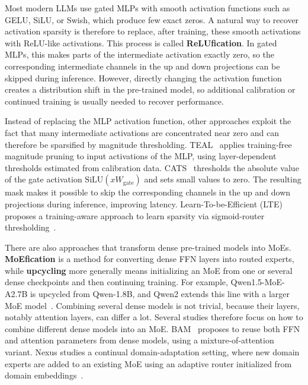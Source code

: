 Most modern LLMs use gated MLPs with smooth activation functions such as GELU,
SiLU, or Swish, which produce few exact zeros. A natural way to recover
activation sparsity is therefore to replace, after training, these smooth activations with
ReLU-like activations. This process is called \textbf{ReLUfication}\citep{mirzadeh2023relustrikesbackexploiting}. In gated
MLPs, this makes parts of the intermediate activation exactly zero, so the
corresponding intermediate channels in the up and down projections can be skipped
during inference. However, directly changing the activation function creates a
distribution shift in the pre-trained model, so additional calibration or
continued training is usually needed to recover performance.

Instead of replacing the MLP activation function, other approaches exploit
the fact that many intermediate activations are concentrated near zero and can
therefore be sparsified by magnitude thresholding. TEAL~\citep{TEAL} applies training-free
magnitude pruning to input activations of the MLP, using layer-dependent
thresholds estimated from calibration data. 
CATS~\citep{lee2024cats} thresholds the absolute value of the gate activation
$\mathrm{SiLU}(xW_{\mathrm{gate}})$ and sets small values to zero. The resulting
mask makes it possible to skip the corresponding channels in the up and down
projections during inference, improving latency. Learn-To-be-Efficient (LTE) proposes
a training-aware approach to learn sparsity via sigmoid-router
thresholding~\citep{zheng2024learntobeefficient}.

There are also approaches that transform dense pre-trained models into MoEs.
\textbf{MoEfication} is a method for converting dense FFN layers into routed experts,
while \textbf{upcycling} more generally means initializing an MoE from one or several
dense checkpoints and then continuing training. For example, Qwen1.5-MoE-A2.7B
is upcycled from Qwen-1.8B, and Qwen2 extends this line with a larger MoE
model~\citep{qwen2024qwen15moe,qwen2}. Combining several dense models is not
trivial, because their layers, notably attention layers, can differ a lot.
Several studies therefore focus on how to combine different dense models into an MoE. 
BAM~\citep{zhang2024bamjustlikethat} proposes to reuse both
FFN and attention parameters from dense models, using a mixture-of-attention
variant. Nexus studies a continual domain-adaptation setting, where new domain
experts are added to an existing MoE using an adaptive router initialized from
domain embeddings~\citep{gritsch-etal-2025-nexus}.

